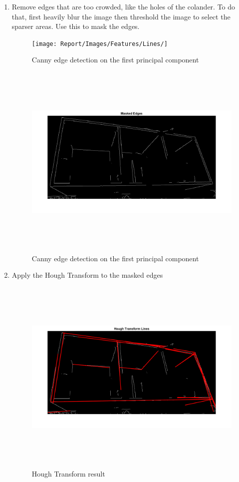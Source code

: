 \begin{enumerate}
    \item Remove edges that are too crowded, like the holes of the colander. To do that, first heavily blur the image then threshold the image to select the sparser areas. Use this to mask the edges.

                \begin{figure}[H]
    \centering
    \texttt{[image: Report/Images/Features/Lines/]}
    \caption{\label{fig:lines:edge}Canny edge detection on the first principal component}
    \end{figure}
    
                \begin{figure}[H]
    \centering
    \includegraphics[height=9.5cm, width=\textwidth, keepaspectratio]{Report/Images/Features/Lines/MaskedEdges.png}
    \caption{\label{fig:lines:edge}Canny edge detection on the first principal component}
    \end{figure}

    \item Apply the Hough Transform to the masked edges

                    \begin{figure}[H]
    \centering
    \includegraphics[height=9.5cm, width=\textwidth, keepaspectratio]{Report/Images/Features/Lines/HoughLines.png}
    \caption{\label{fig:lines:lines}Hough Transform result}
    \end{figure}



\end{enumerate}
